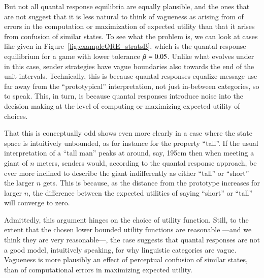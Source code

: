 But not all quantal response equilibria are equally plausible, and the
ones that are not suggest that it is less natural to think of
vagueness as arising from of errors in the computation or maximization
of expected utility than that it arises from confusion of similar
states. To see what the problem is, we can look at cases like given in
Figure~\ref{fig:exampleQRE_stratsB}, which is the quantal response
equilibrium for a game with lower tolerance $\beta = 0.05$. Unlike
what evolves under \rdd in this case, sender strategies have vague
boundaries also towards the end of the unit intervals. Technically,
this is because quantal responses equalize message use far away from
the ``prototypical'' interpretation, not just in-between categories,
so to speak. This, in turn, is because quantal responses introduce
noise into the decision making at the level of computing or maximizing
expected utility of choices.

That this is conceptually odd shows even more clearly in a case where
the state space is intuitively unbounded, as for instance for the
property ``tall''. If the usual interpretation of a ``tall man'' peaks
at around, say, 195cm then when meeting a giant of $n$ meters, senders
would, according to the quantal response approach, be ever more
inclined to describe the giant indifferently as either ``tall'' or
``short'' the larger $n$ gets. This is because, as the distance from
the prototype increases for larger $n$, the difference between the
expected utilities of saying ``short'' or ``tall'' will converge to
zero. 

Admittedly, this argument hinges on the choice of utility
function. Still, to the extent that the chosen lower bounded utility
functions are reasonable ---and we think they are very reasonable---,
the case suggests that quantal responses are not a good model,
intuitively speaking, for why linguistic categories are
vague. Vagueness is more plausibly an effect of perceptual confusion
of similar states, than of computational errors in maximizing expected
utility.




